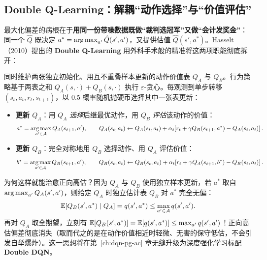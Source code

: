 \subsection{Double Q-Learning：解耦“动作选择”与“价值评估”}

最大化偏差的病根在于\textbf{用同一份带噪数据既做“裁判选冠军”又做“会计发奖金”}：同一个 $\hat{Q}$ 既决定 $a^* = \operatorname*{arg\,max}_{a'} \hat{Q}(s', a')$，又提供估值 $\hat{Q}(s', a^*)$。Hasselt（2010）提出的 \textbf{Double Q-Learning} 用外科手术般的精准将这两项职能彻底拆开：

\begin{defBox}
\begin{definition}
同时维护两张独立初始化、用互不重叠样本更新的动作价值表 $Q_A$ 与 $Q_B$。行为策略基于两表之和 $Q_A(s, \cdot) + Q_B(s, \cdot)$ 执行 $\varepsilon$-贪心。每观测到单步转移 $(s_t, a_t, r_t, s_{t+1})$，以 $0.5$ 概率随机抛硬币选择其中一张表更新：
\begin{itemize}
  \item \textbf{更新 $Q_A$}：用 $Q_A$ \emph{选择}后继最优动作，用 $Q_B$ \emph{评估}该动作的价值：
  \begin{equation}
    a^* = \operatorname*{arg\,max}_{a' \in \mathcal{A}} Q_A(s_{t+1}, a'), \qquad
    Q_A(s_t, a_t) \leftarrow Q_A(s_t, a_t) + \alpha_t \!\left[r_t + \gamma Q_B(s_{t+1}, a^*) - Q_A(s_t, a_t)\right].
    \label{eq:double-q-a}
  \end{equation}
  \item \textbf{更新 $Q_B$}：完全对称地用 $Q_B$ 选择动作、用 $Q_A$ 评估价值：
  \begin{equation}
    b^* = \operatorname*{arg\,max}_{a' \in \mathcal{A}} Q_B(s_{t+1}, a'), \qquad
    Q_B(s_t, a_t) \leftarrow Q_B(s_t, a_t) + \alpha_t \!\left[r_t + \gamma Q_A(s_{t+1}, b^*) - Q_B(s_t, a_t)\right].
    \label{eq:double-q-b}
  \end{equation}
\end{itemize}
\end{definition}
\end{defBox}

为何这样就能治愈正向高估？因为 $Q_A$ 与 $Q_B$ 使用独立样本更新，若 $a^*$ 取自 $\operatorname*{arg\,max}_{a'} Q_A(s', a')$，则给定 $Q_A$ 时独立估计表 $Q_B$ 对 $a^*$ 完全无偏：
\[
  \mathbb{E}\!\left[Q_B(s', a^*) \mid Q_A\right] = q(s', a^*) \le \max_{a' \in \mathcal{A}} q(s', a').
\]
再对 $Q_A$ 取全期望，立刻有 $\mathbb{E}[Q_B(s', a^*)] = \mathbb{E}[q(s', a^*)] \le \max_{a'} q(s', a')$！正向高估偏差彻底消失（取而代之的是在动作价值相近时轻微、无害的保守低估，不会引发自举爆炸）。这一思想将在第~\ref{ch:dqn-pg-ac} 章无缝升级为深度强化学习标配 \textbf{Double DQN}。

